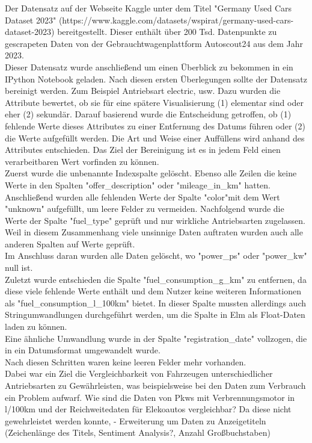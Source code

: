 \documentclass[usegeometry=true]{scrartcl}
\begin{document}
Der Datensatz auf der Webseite Kaggle unter dem Titel "Germany Used Cars Dataset 2023" (https://www.kaggle.com/datasets/wspirat/germany-used-cars-dataset-2023) bereitgestellt. Dieser enthält über 200 Tsd. Datenpunkte zu gescrapeten Daten von der Gebrauchtwagenplattform Autoscout24 aus dem Jahr 2023. \\
Dieser Datensatz wurde anschließend um einen Überblick zu bekommen in ein IPython Notebook geladen. 
Nach diesen ersten Überlegungen sollte der Datensatz bereinigt werden. Zum Beispiel Antriebsart electric, usw.  Dazu wurden die Attribute bewertet, ob sie für eine spätere Visualisierung (1) elementar sind oder eher (2) sekundär. Darauf basierend wurde die Entscheidung getroffen, ob (1) fehlende Werte dieses Attributes zu einer Entfernung des Datums führen oder (2) die Werte aufgefüllt werden. Die Art und Weise einer Auffüllens wird anhand des Attributes entschieden. Das Ziel der Bereinigung ist es in jedem Feld einen verarbeitbaren Wert vorfinden zu können.\\
Zuerst wurde die unbenannte Indexspalte gelöscht.
Ebenso alle Zeilen die keine Werte in den Spalten "offer_description" oder "mileage_in_km" hatten. 
Anschließend wurden alle fehlenden Werte der Spalte "color"mit dem Wert "unknown" aufgefüllt, um leere Felder zu vermeiden. Nachfolgend wurde die Werte  der Spalte "fuel_type" geprüft und nur wirkliche Antriebsarten zugelassen. \\
Weil in diesem Zusammenhang viele unsinnige Daten auftraten wurden auch alle anderen Spalten auf Werte geprüft.\\
Im Anschluss daran wurden alle Daten gelöscht, wo "power_ps" oder "power_kw" null ist.\\
Zuletzt wurde entschieden die Spalte "fuel_consumption_g_km" zu entfernen, da diese viele fehlende Werte enthält und dem Nutzer keine weiteren Informationen als "fuel_consumption_l_100km" bietet. In dieser Spalte mussten allerdings auch Stringumwandlungen durchgeführt werden, um die Spalte in Elm als Float-Daten laden zu können. \\
Eine ähnliche Umwandlung wurde in der Spalte "registration_date" vollzogen, die in ein Datumsformat umgewandelt wurde.\\
Nach diesen Schritten waren keine leeren Felder mehr vorhanden. \\
Dabei war ein Ziel die Vergleichbarkeit von Fahrzeugen unterschiedlicher Antriebsarten zu Gewährleisten, was beispielsweise bei den Daten zum Verbrauch ein Problem aufwarf. Wie sind die Daten von Pkws mit Verbrennungsmotor in l/100km und der Reichweitedaten für Elekoautos vergleichbar? Da diese nicht gewehrleistet werden konnte, 
- Erweiterung um Daten zu Anzeigetiteln (Zeichenlänge des Titels, Sentiment Analysis?, Anzahl Großbuchstaben) \\
\end{document}

